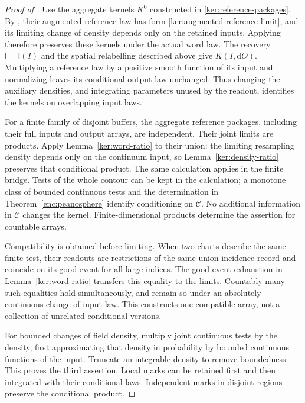 \documentclass[11pt]{article}
\numberwithin{equation}{section}
\theoremstyle{definition}
\theoremstyle{remark}
\newcommand{\dd}{\mathrm d}
\newcommand{\1}{\mathbf 1}
\begin{document}
\begin{proof}[Proof of ]
Use the aggregate kernels \(K^0\) constructed in
\eqref{ker:reference-packages}. By , their
augmented reference law has form
\eqref{ker:augmented-reference-limit}, and its limiting change of
density depends only on the retained inputs. Applying
 therefore preserves these kernels under the
actual word law. The recovery \(\mathsf I=\mathsf I(I)\) and the
spatial relabelling described above give \(K(I,\dd O)\).
Multiplying a reference law by a positive smooth function of its input
and normalizing leaves its conditional output law unchanged.  Thus
changing the auxiliary densities, and integrating parameters unused
by the readout, identifies the kernels on overlapping input laws.

For a finite family of disjoint buffers, the aggregate reference
packages, including their full inputs and output arrays, are independent.
Their joint limits are products.  Apply Lemma~\ref{ker:word-ratio}
to their union: the limiting resampling density depends only on the
continuum input, so Lemma~\ref{ker:density-ratio} preserves that
conditional product.  The same calculation applies in the finite
bridge.  Tests of the whole contour can be kept in the calculation;
a monotone class of bounded continuous tests and the determination
in Theorem~\ref{enc:peanosphere} identify conditioning on
\(\mathcal C\).  No additional information in \(\mathcal C\) changes
the kernel.  Finite-dimensional products determine the assertion for
countable arrays.

Compatibility is obtained before limiting.  When two charts describe
the same finite test, their readouts are restrictions of the same
union incidence record and coincide on its good event for all large
indices.  The good-event exhaustion in Lemma~\ref{ker:word-ratio}
transfers this equality to the limits.  Countably many such equalities
hold simultaneously, and remain so under an absolutely continuous
change of input law.  This constructs one compatible array, not a
collection of unrelated conditional versions.

For bounded changes of field density, multiply joint continuous tests
by the density, first approximating that density in probability by
bounded continuous functions of the input.  Truncate an integrable
density to remove boundedness.  This proves the third assertion.
Local marks can be retained first and then integrated with their
conditional laws.  Independent marks in disjoint regions preserve
the conditional product.


\end{proof}
\end{document}

